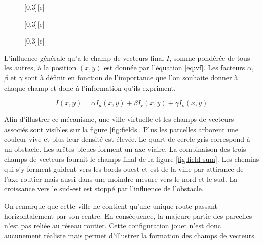 \documentclass[12pt]{article}
\begin{document}
\begin{figure}[H]
  \centering
  \subcaptionbox{}[0.3\linewidth][c]{
    
  }
  \subcaptionbox{}[0.3\linewidth][c]{
    
  }
  \subcaptionbox{}[0.3\linewidth][c]{
    
  }
  \caption{}
  \label{fig:bilinear-interp}
\end{figure}

L'influence générale qu'a le champ de vecteurs final $I$, somme
pondérée de tous les autres, à la position $(x,y)$ est donnée par
l'équation \ref{eq:vf}. Les facteurs $\alpha$, $\beta$ et $\gamma$
sont à définir en fonction de l'importance que l'on souhaite donner à
chaque champ et donc à l'information qu'ils expriment.

\begin{equation}
  I(x,y) = \alpha I_d(x,y) + \beta I_r(x,y) + \gamma I_o(x,y)
  \label{eq:vf}
\end{equation}

Afin d'illustrer ce mécanisme, une ville virtuelle et les champs de
vecteurs associés sont visibles sur la figure \ref{fig:fields}. Plus
les parcelles arborent une couleur vive et plus leur densité est
élevée. Le quart de cercle gris correspond à un obstacle. Les arêtes
bleues forment un axe viaire. La combinaison des trois champs de
vecteurs fournit le champs final de la figure \ref{fig:field-sum}. Les
chemins qui s'y forment guident vers les bords ouest et est de la
ville par attirance de l'axe routier mais aussi dans une moindre
mesure vers le nord et le sud. La croissance vers le sud-est est
stoppé par l'influence de l'obstacle.

On remarque que cette ville ne contient qu'une unique route passant
horizontalement par son centre. En conséquence, la majeure partie des
parcelles n'est pas reliée au réseau routier. Cette configuration
jouet n'est donc aucunement réaliste mais permet d'illustrer la
formation des champs de vecteurs.
\end{document}
